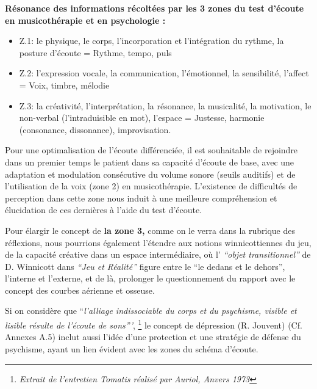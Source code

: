 


	\textbf{Résonance des informations récoltées par les 3
          zones du test d'écoute en musicothérapie et en
  psychologie :}

\begin{itemize}
 \item  Z.1: le physique, le corps, l'incorporation et
l'intégration du rythme,
la posture d'écoute  =  Rythme, tempo, puls

\item  Z.2:  l'expression vocale, la communication,
l'émotionnel, la sensibilité, l'affect = Voix, timbre, mélodie

\item Z.3: la créativité, l'interprétation, la
résonance, la musicalité, la motivation, le non-verbal (l'intraduisible en mot), l'espace = Justesse, harmonie (consonance,
dissonance), improvisation.
\end{itemize}


Pour une optimalisation de l'écoute différenciée, il est souhaitable
de rejoindre dans un premier temps  le patient dans sa capacité
d'écoute de base, avec une adaptation et modulation consécutive du
volume sonore (seuils auditifs) et de l'utilisation de la voix (zone
2) en musicothérapie.
L'existence de difficultés de perception dans cette zone nous
induit à une meilleure compréhension et  élucidation de ces dernières à l'aide du
test d'écoute.

Pour élargir le concept de\textbf{ la zone 3,} comme on le
verra dans la rubrique des réflexions, nous pourrions
également l'étendre aux notions winnicottiennes du jeu, de la capacité
créative dans un espace
intermédiaire, où l' \textit{``objet
transitionnel'' } de D. Winnicott dans \textit{``Jeu et Réalité''}
\autocite{winnicott}
figure entre le ``le
dedans et le
dehors'',
l'interne et l'externe, et de là,  prolonger le questionnement du
rapport avec le concept des
courbes aérienne et osseuse.



Si on considère que ``\emph{l'alliage indissociable du corps et du psychisme,
visible et lisible résulte de l'écoute de
sons'''}, \footnote{\emph{Extrait de l'entretien Tomatis réalisé par
  Auriol, Anvers 1973}} le concept de dépression (R. Jouvent) \autocite{doronparot} (Cf. Annexes
A.5) inclut aussi l'idée d'une protection et une stratégie de
défense du psychisme, ayant un lien évident avec les zones du schéma d'écoute.


